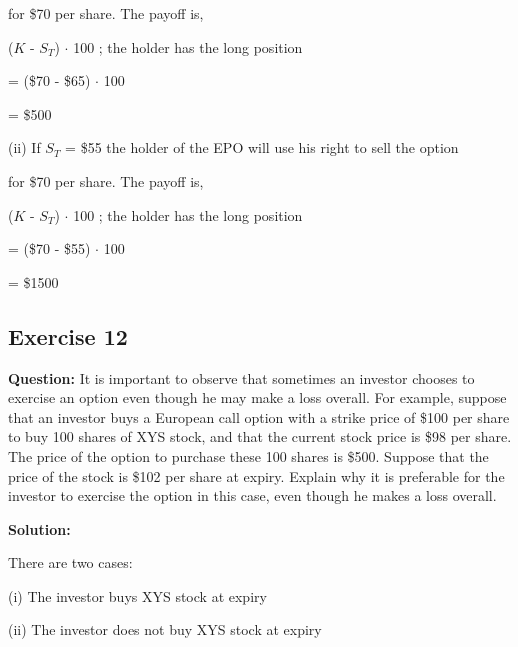 \documentclass{article}
\begin{document}
for \$70 per share. The payoff is,

\vspace{\baselineskip}

($K$ - $S_T$) $\cdot$ 100 ; the holder has the long position

\vspace{\baselineskip}

= (\$70 - \$65) $\cdot$ 100

\vspace{\baselineskip}

= \$500

\vspace{\baselineskip}

(ii) If $S_T$ = \$55 the holder of the EPO will use his right to sell the option 

for \$70 per share. The payoff is,

\vspace{\baselineskip}

($K$ - $S_T$) $\cdot$ 100 ; the holder has the long position 

\vspace{\baselineskip}

= (\$70 - \$55) $\cdot$ 100

\vspace{\baselineskip}

= \$1500

\subsection*{Exercise 12}

\textbf{Question:} It is important to observe that sometimes an investor chooses to exercise an option even though
he may make a loss overall. For example, suppose that an investor buys a European call option with a strike
price of \$100 per share to buy 100 shares of XYS stock, and that the current stock price is \$98 per share. The price of the option to purchase these 100 shares is \$500. Suppose that the price of the stock is \$102 per share at expiry. Explain why it is preferable for the investor to exercise the option in this case, even though he makes a loss overall.

\textbf{Solution:}

There are two cases:


(i) The investor buys XYS stock at expiry 

(ii) The investor does not buy XYS stock at expiry

\vspace{\baselineskip}
\end{document}
